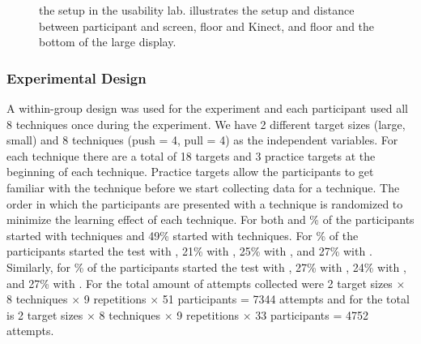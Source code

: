\begin{figure}[H]
\caption{\protect{} the setup in the usability lab. \protect{} illustrates the setup and distance between participant and screen, floor and Kinect, and floor and the bottom of the large display.}
\end{figure}

\subsubsection{Experimental Design} \label{}
A within-group design was used for the experiment and each participant used all 8 techniques once during the experiment.
We have 2 different target sizes (large, small) and 8 techniques (push = 4, pull = 4) as the independent variables.
For each technique there are a total of 18 targets and 3 practice targets at the beginning of each technique. 
Practice targets allow the participants to get familiar with the technique before we start collecting data for a technique.
The order in which the participants are presented with a technique is randomized to minimize the learning effect of each technique.
For both \target and \% of the participants started with \push techniques and 49\% started with \pull techniques.
For \% of the participants started the test with \grab, 21\% with \swipe, 25\% with \throw, and 27\% with \tilt.
Similarly, for \% of the participants started the test with \grab, 27\% with \swipe, 24\% with \throw, and 27\% with \tilt.
For \target the total amount of attempts collected were 2 target sizes $\times$ 8 techniques $\times$ 9 repetitions $\times$ 51 participants = 7344 attempts and for \accuracy the total is 2 target sizes $\times$ 8 techniques $\times$ 9 repetitions $\times$ 33 participants = 4752 attempts.

